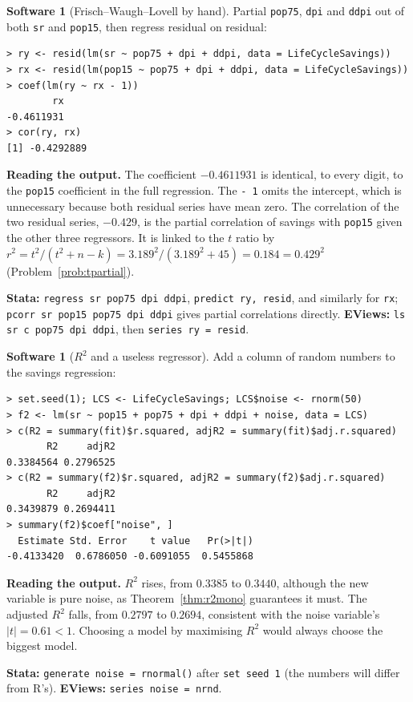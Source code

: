 \documentclass[11pt,a4paper]{article}
\numberwithin{equation}{section}
\theoremstyle{definition}
\newtheorem{software}[thm]{Software}
\begin{document}
\begin{software}[Frisch--Waugh--Lovell by hand]
\label{sw:fwl}
Partial \texttt{pop75}, \texttt{dpi} and \texttt{ddpi} out of both \texttt{sr} and \texttt{pop15}, then regress residual on residual:
{\small\begin{verbatim}
> ry <- resid(lm(sr ~ pop75 + dpi + ddpi, data = LifeCycleSavings))
> rx <- resid(lm(pop15 ~ pop75 + dpi + ddpi, data = LifeCycleSavings))
> coef(lm(ry ~ rx - 1))
        rx
-0.4611931
> cor(ry, rx)
[1] -0.4292889
\end{verbatim}}
\textbf{Reading the output.} The coefficient $-0.4611931$ is identical, to every digit, to the \texttt{pop15} coefficient in the full regression. The
\texttt{- 1} omits the intercept, which is unnecessary because both residual series have mean zero. The correlation of the two residual series,
$-0.429$, is the partial correlation of savings with \texttt{pop15} given the other three regressors. It is linked to the $t$ ratio by
$r^2 = t^2/(t^2 + n - k) = 3.189^2/(3.189^2 + 45) = 0.184 = 0.429^2$ (Problem~\ref{prob:tpartial}).

\textbf{Stata:} \texttt{regress sr pop75 dpi ddpi}, \texttt{predict ry, resid}, and similarly for \texttt{rx}; \texttt{pcorr sr pop15 pop75 dpi ddpi}
gives partial correlations directly. \textbf{EViews:} \texttt{ls sr c pop75 dpi ddpi}, then \texttt{series ry = resid}.
\end{software}

\begin{software}[$R^2$ and a useless regressor]
\label{sw:noise}
Add a column of random numbers to the savings regression:
{\small\begin{verbatim}
> set.seed(1); LCS <- LifeCycleSavings; LCS$noise <- rnorm(50)
> f2 <- lm(sr ~ pop15 + pop75 + dpi + ddpi + noise, data = LCS)
> c(R2 = summary(fit)$r.squared, adjR2 = summary(fit)$adj.r.squared)
       R2     adjR2
0.3384564 0.2796525
> c(R2 = summary(f2)$r.squared, adjR2 = summary(f2)$adj.r.squared)
       R2     adjR2
0.3439879 0.2694411
> summary(f2)$coef["noise", ]
  Estimate Std. Error    t value   Pr(>|t|)
-0.4133420  0.6786050 -0.6091055  0.5455868
\end{verbatim}}
\textbf{Reading the output.} $R^2$ rises, from $0.3385$ to $0.3440$, although the new variable is pure noise, as Theorem~\ref{thm:r2mono} guarantees it must.
The adjusted $R^2$ falls, from $0.2797$ to $0.2694$, consistent with the noise variable's $|t| = 0.61 < 1$. Choosing a model by maximising $R^2$ would
always choose the biggest model.

\textbf{Stata:} \texttt{generate noise = rnormal()} after \texttt{set seed 1} (the numbers will differ from R's). \textbf{EViews:} \texttt{series noise = nrnd}.
\end{software}
\end{document}
